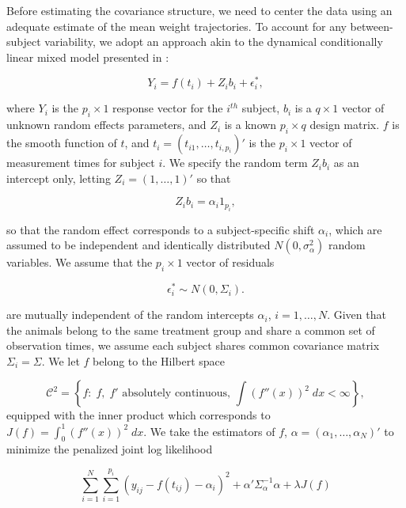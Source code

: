 Before estimating the covariance structure, we need to center the data using an adequate estimate of the mean weight trajectories. To account for any between-subject variability, we adopt an approach akin to the dynamical conditionally linear mixed model presented in \cite{pourahmadi2002dynamic}:

\begin{equation}
Y_i = f\left(t_i  \right) + Z_i b_i + \epsilon^*_i,
\end{equation} 

\noindent
where $Y_i$ is the $p_i \times 1$ response vector for the $i^{th}$ subject, $b_i$ is a $q \times 1$ vector of unknown random effects parameters, and $Z_i$ is a known $p_i \times q$ design matrix.  $f$ is the smooth function of $t$, and $t_i = \left(t_{i1}, \dots, t_{i,p_i}\right)'$ is the $p_i \times 1$ vector of measurement times for subject $i$. We specify the random term $Z_i b_i$ as an intercept only, letting $Z_i = \left(1 , \dots, 1\right)'$ so that 

\[
 Z_i b_i = \alpha_i 1_{p_i}, 
\] 

\noindent
so that the random effect corresponds to a subject-specific shift $\alpha_i$, which are assumed to be independent and identically distributed $N\left(0,\sigma_\alpha^2\right)$ random variables. We assume that the $p_i \times 1$ vector of residuals

\[
\epsilon^*_i \sim N\left(0, \Sigma_i\right).
\] 

\noindent
are mutually independent of the random intercepts $\alpha_i$, $i = 1,\dots, N$. Given that the animals belong to the same treatment group and share a common set of observation times, we assume each subject shares common covariance matrix $\Sigma_i = \Sigma$. We let $f$ belong to the Hilbert space

\[
\mathcal{C}^2 = \left\{f: \; f,\;f' \mbox{ absolutely continuous, } \int\left(f''\left(x\right)\right)^2 \;dx < \infty  \right\}, 
\]
equipped with the inner product which corresponds to $J\left(f\right) = \int_0^1 \left(f''\left(x\right)\right)^2\;dx$.
\noindent
We take the estimators of $f$, $\alpha = \left(\alpha_1,\dots, \alpha_N\right)'$ to minimize the penalized joint log likelihood

\begin{equation}
\sum_{i = 1}^N \sum_{i = 1}^{p_i} \left(y_{ij} - f\left(t_{ij} \right) - \alpha_i \right)^2 + \alpha' \Sigma_\alpha^{-1} \alpha + \lambda J \left(f\right)
\end{equation}

